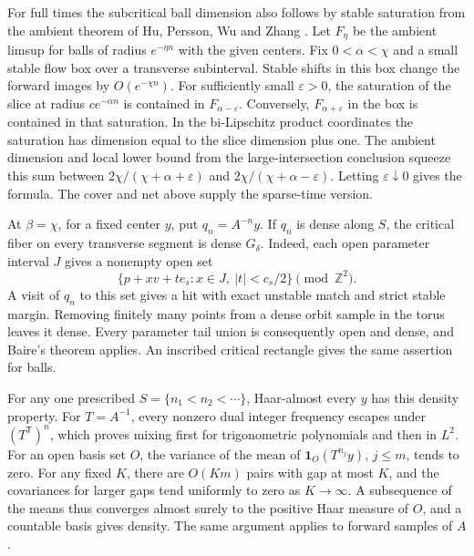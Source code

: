 \documentclass[11pt,a4paper,reqno]{amsart}
\theoremstyle{definition}
\theoremstyle{remark}
\numberwithin{equation}{section}
\begin{document}
For full times the subcritical ball dimension also follows by stable
saturation from the ambient theorem of Hu, Persson, Wu and Zhang
\cite[Theorem~2.1]{HPWZ}. Let \(F_\eta\) be the ambient limsup for
balls of radius \(e^{-\eta n}\) with the given centers. Fix
\(0<\alpha<\chi\) and a small stable flow box over a transverse
subinterval. Stable shifts in this box change the forward images
by \(O(e^{-\chi n})\). For sufficiently small \(\varepsilon>0\), the
saturation of the slice at radius \(c e^{-\alpha n}\) is contained
in \(F_{\alpha-\varepsilon}\). Conversely, \(F_{\alpha+\varepsilon}\)
in the box is contained in that saturation. In the bi-Lipschitz
product coordinates the saturation has dimension equal to the slice
dimension plus one. The ambient dimension and local lower bound
from the large-intersection conclusion squeeze this sum between
\(2\chi/(\chi+\alpha+\varepsilon)\) and
\(2\chi/(\chi+\alpha-\varepsilon)\). Letting \(\varepsilon\downarrow0\)
gives the formula. The cover and net above supply the sparse-time
version.

At \(\beta=\chi\), for a fixed center \(y\), put \(q_n=A^{-n}y\).
If \(q_n\) is dense along \(S\), the critical fiber on every
transverse segment is dense \(G_\delta\). Indeed, each open parameter
interval \(J\) gives a nonempty open set
\begin{equation}\label{eq:critical-open-box}
 \{p+xv+t e_s:x\in J,\ |t|<c_s/2\}\pmod{\mathbb Z^2}.
\end{equation}
A visit of \(q_n\) to this set gives a hit with exact unstable
match and strict stable margin. Removing finitely many points from
a dense orbit sample in the torus leaves it dense. Every parameter
tail union is consequently open and dense, and Baire's theorem
applies. An inscribed critical rectangle gives the same assertion
for balls.

For any one prescribed \(S=\{n_1<n_2<\cdots\}\), Haar-almost every
\(y\) has this density property. For \(T=A^{-1}\), every nonzero
dual integer frequency escapes under
\((T^{\mathsf T})^n\), which proves mixing first for trigonometric
polynomials and then in \(L^2\). For an open basis set \(O\), the
variance of the mean of \(\mathbf 1_O(T^{n_j}y)\), \(j\le m\),
tends to zero. For any fixed \(K\), there are \(O(Km)\) pairs with
gap at most \(K\), and the covariances for larger gaps tend uniformly
to zero as \(K\to\infty\). A subsequence of the means thus converges
almost surely to the positive Haar measure of \(O\), and a countable
basis gives density. The same argument applies to forward samples
of \(A\).
\end{document}

